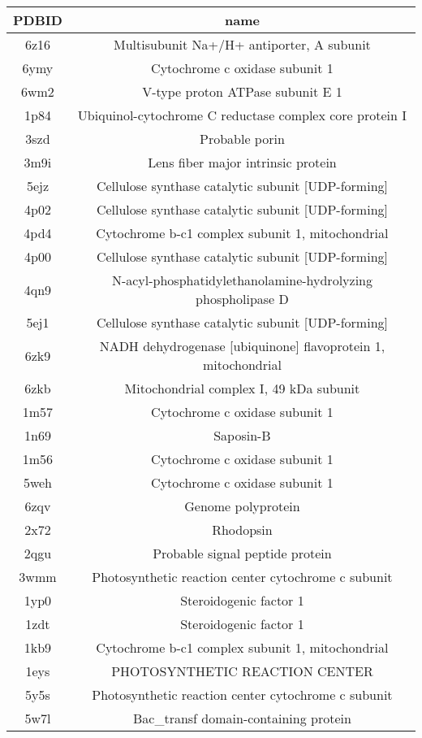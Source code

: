 \documentclass{article}
\begin{document}
\begin{table}[]
    \centering
    \begin{tabular}{c|c}
PDBID & name \\
\hline
6z16 & Multisubunit Na+/H+ antiporter, A subunit \\ 
6ymy & Cytochrome c oxidase subunit 1 \\ 
6wm2 & V-type proton ATPase subunit E 1 \\ 
1p84 & Ubiquinol-cytochrome C reductase complex core protein I \\ 
3szd & Probable porin \\ 
3m9i & Lens fiber major intrinsic protein \\ 
5ejz & Cellulose synthase catalytic subunit [UDP-forming] \\ 
4p02 & Cellulose synthase catalytic subunit [UDP-forming] \\ 
4pd4 & Cytochrome b-c1 complex subunit 1, mitochondrial \\ 
4p00 & Cellulose synthase catalytic subunit [UDP-forming] \\ 
4qn9 & N-acyl-phosphatidylethanolamine-hydrolyzing phospholipase D \\ 
5ej1 & Cellulose synthase catalytic subunit [UDP-forming] \\ 
6zk9 & NADH dehydrogenase [ubiquinone] flavoprotein 1, mitochondrial \\ 
6zkb & Mitochondrial complex I, 49 kDa subunit \\ 
1m57 & Cytochrome c oxidase subunit 1 \\ 
1n69 & Saposin-B \\ 
1m56 & Cytochrome c oxidase subunit 1 \\ 
5weh & Cytochrome c oxidase subunit 1 \\ 
6zqv & Genome polyprotein \\ 
2x72 & Rhodopsin \\ 
2qgu & Probable signal peptide protein \\ 
3wmm & Photosynthetic reaction center cytochrome c subunit \\ 
1yp0 & Steroidogenic factor 1 \\ 
1zdt & Steroidogenic factor 1 \\ 
1kb9 & Cytochrome b-c1 complex subunit 1, mitochondrial \\ 
1eys & PHOTOSYNTHETIC REACTION CENTER \\ 
5y5s & Photosynthetic reaction center cytochrome c subunit \\ 
5w7l & Bac\_transf domain-containing protein \\ 

\end{tabular}
\end{table}
\end{document}
